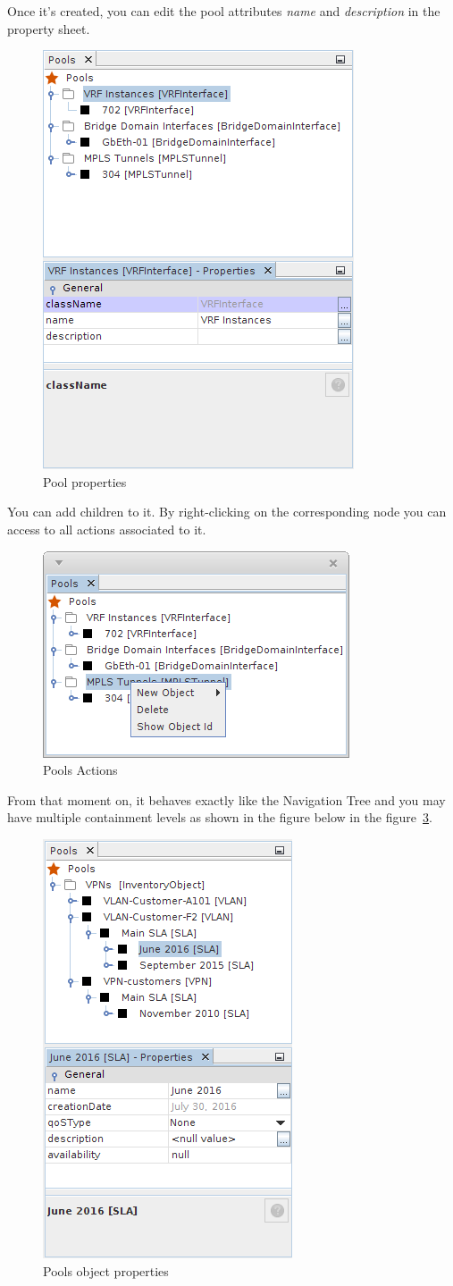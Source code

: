 \documentclass[a4paper]{article}
\begin{document}
	\newpage
	Once it's created, you can edit the pool attributes \textit{name} and \textit{description} in the property sheet.
	\begin{figure}[h!]
		\centering
		\includegraphics[width=0.5\linewidth]{img/pools_pool_properties.png}
		\caption{Pool properties}
		\label{fig:pools_pool_properties}
	\end{figure}
	
	You can add children to it. By right-clicking on the corresponding node you can access to all actions associated to it. 
	\begin{figure}[h!]
		\centering
		\includegraphics[width=0.5\linewidth]{img/pools_pool_action.png}
		\caption{Pools Actions}
		\label{fig:pools_pool_action}
	\end{figure}
	
	\newpage
	From that moment on, it behaves exactly like the Navigation Tree and you may have multiple containment levels as shown in the figure below in the figure~\ref{fig:pools_pool_object_properties}.	
	\begin{figure}[h!]
		\centering
		\includegraphics[width=0.3\linewidth]{img/pools_pool_object_properties.png}
		\caption{Pools object properties}
		\label{fig:pools_pool_object_properties}
	\end{figure}
				
\end{document}
